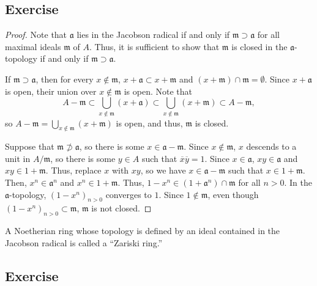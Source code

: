 \subsection{Exercise}\label{10.6}

\begin{proof}
Note that $\mathfrak{a}$ lies in the Jacobson radical if and only if $\mathfrak{m} \supset \mathfrak{a}$ for all maximal ideals
$\mathfrak{m}$ of $A$. Thus, it is sufficient to show that $\mathfrak{m}$ is closed in the $\mathfrak{a}$-topology if and only if
$\mathfrak{m} \supset \mathfrak{a}$.

If $\mathfrak{m} \supset \mathfrak{a}$, then for every $x \not\in \mathfrak{m}$, $x + \mathfrak{a} \subset x + \mathfrak{m}$ and
$(x + \mathfrak{m}) \cap \mathfrak{m} = \emptyset$. Since $x + \mathfrak{a}$ is open, their union over $x \not\in \mathfrak{m}$
is open. Note that
$$A - \mathfrak{m} \subset \bigcup_{x \not\in \mathfrak{m}} (x + \mathfrak{a}) 
\subset \bigcup_{x \not\in \mathfrak{m}} (x + \mathfrak{m}) \subset A - \mathfrak{m},$$
so $A - \mathfrak{m} = \bigcup_{x \not\in \mathfrak{m}} (x + \mathfrak{m})$ is open, and thus, $\mathfrak{m}$ is closed.

Suppose that $\mathfrak{m} \not\supset \mathfrak{a}$, so there is some $x \in \mathfrak{a} - \mathfrak{m}$. Since
$x \not\in \mathfrak{m}$, $x$ descends to a unit in $A/\mathfrak{m}$, so there is some $y \in A$ such that $\overline{x}\overline{y} = 1$.
Since $x \in \mathfrak{a}$, $xy \in \mathfrak{a}$ and $xy \in 1 + \mathfrak{m}$. Thus, replace $x$ with $xy$, so we have
$x \in \mathfrak{a} - \mathfrak{m}$ such that $x \in 1 + \mathfrak{m}$. Then, $x^n \in \mathfrak{a}^n$ and $x^n \in 1 + \mathfrak{m}$.
Thus, $1 - x^n \in (1 + \mathfrak{a}^n) \cap \mathfrak{m}$ for all $n > 0$. In the $\mathfrak{a}$-topology, $(1 - x^n)_{n>0}$ converges
to $1$. Since $1 \not\in \mathfrak{m}$, even though $(1 - x^n)_{n>0} \subset \mathfrak{m}$, $\mathfrak{m}$ is not closed.
\end{proof}

\begin{remark}
A Noetherian ring whose topology is defined by an ideal contained in the Jacobson radical is called a ``Zariski ring.''
\end{remark}

\subsection{Exercise}\label{10.7}

